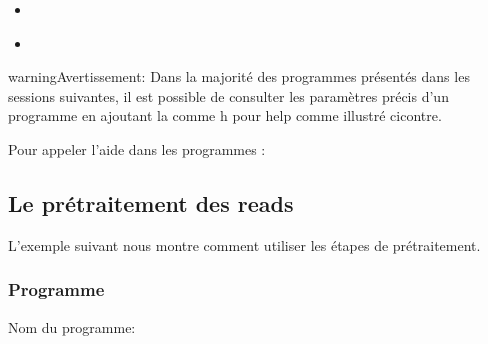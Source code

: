 \documentclass[letterpaper,10pt,french]{sphinxmanual}
\begin{document}
\begin{sphinxShadowBox}
\begin{itemize}
\begin{itemize}
\item {} 
\label{\detokenize{tutorial:id45}}{\hyperref[\detokenize{tutorial:creation-d-une-base-de-donnees-avec-la-suite-blast}]{}}

\item {} 
\label{\detokenize{tutorial:id46}}{\hyperref[\detokenize{tutorial:classification-des-reads-avec-la-suite-blast}]{}}

\end{itemize}

\end{itemize}
\end{sphinxShadowBox}
\label{\detokenize{tutorial:pre-processing}}
\begin{sphinxadmonition}{warning}{Avertissement:}
Dans la majorité des programmes présentés dans les sessions suivantes, il est possible de consulter les paramètres précis d’un programme en ajoutant la comme \sphinxhyphen{}h pour help comme illustré ci\sphinxhyphen{}contre.
\end{sphinxadmonition}

Pour appeler l’aide dans les programmes :

\begin{sphinxVerbatim}[commandchars=\\\{\}]
 
\end{sphinxVerbatim}


\subsection{Le pré\sphinxhyphen{}traitement des reads}
\label{\detokenize{tutorial:le-pre-traitement-des-reads}}
L’exemple suivant nous montre comment utiliser les étapes de pré\sphinxhyphen{}traitement.


\subsubsection{Programme}
\label{\detokenize{tutorial:programme}}
Nom du programme:

\begin{sphinxVerbatim}[commandchars=\\\{\}]
\end{sphinxVerbatim}
\end{document}
